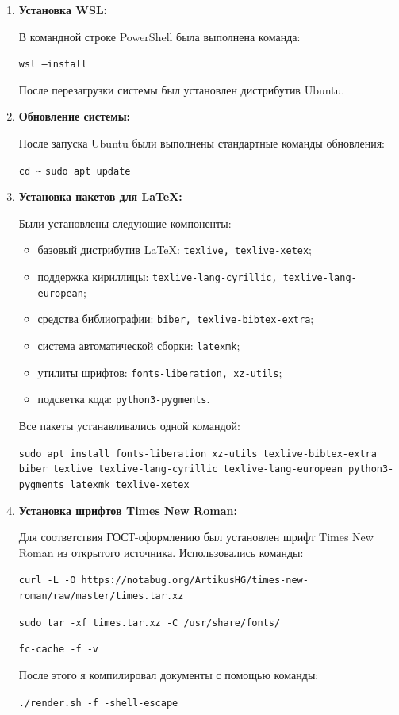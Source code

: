\documentclass[a4paper,12pt]{report}
\begin{document}
\begin{enumerate}
    \item \textbf{Установка WSL:}
    
    В командной строке PowerShell была выполнена команда:

    \texttt{wsl --install}

    После перезагрузки системы был установлен дистрибутив Ubuntu.

    \item \textbf{Обновление системы:}

    После запуска Ubuntu были выполнены стандартные команды обновления:

    \texttt{cd \~{}}  
    \texttt{sudo apt update}

    \item \textbf{Установка пакетов для \LaTeX{}:}

    Были установлены следующие компоненты:

    \begin{itemize}
        \item базовый дистрибутив \LaTeX{}: \texttt{texlive, texlive-xetex};
        \item поддержка кириллицы: \texttt{texlive-lang-cyrillic, texlive-lang-european};
        \item средства библиографии: \texttt{biber, texlive-bibtex-extra};
        \item система автоматической сборки: \texttt{latexmk};
        \item утилиты шрифтов: \texttt{fonts-liberation, xz-utils};
        \item подсветка кода: \texttt{python3-pygments}.
    \end{itemize}

    Все пакеты устанавливались одной командой:

    \texttt{sudo apt install fonts-liberation xz-utils texlive-bibtex-extra biber texlive texlive-lang-cyrillic texlive-lang-european python3-pygments latexmk texlive-xetex}

    \item \textbf{Установка шрифтов Times New Roman:}

    Для соответствия ГОСТ-оформлению был установлен шрифт Times New Roman из открытого источника. Использовались команды:

    \texttt{curl -L -O https://notabug.org/ArtikusHG/times-new-roman/raw/master/times.tar.xz}

    \texttt{sudo tar -xf times.tar.xz -C /usr/share/fonts/}

    \texttt{fc-cache -f -v}

    После этого я компилировал документы с помощью команды:

    \texttt{./render.sh -f -shell-escape}

\end{enumerate}
\end{document}
